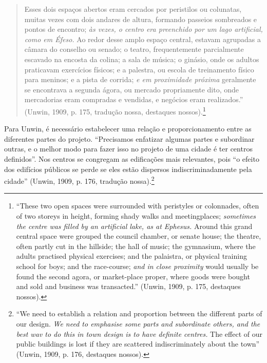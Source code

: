 \documentclass[12pt, a4paper]{book} %
\begin{document}
        \begin{quotation}
            Esses dois espaços abertos eram cercados por peristilos ou colunatas, muitas vezes com dois andares de altura, formando passeios sombreados e pontos de encontro; \textit{às vezes, o centro era preenchido por um lago artificial, como em Éfeso.} Ao redor desse amplo espaço central, estavam agrupadas a câmara do conselho ou senado; o teatro, frequentemente parcialmente escavado na encosta da colina; a sala de música; o ginásio, onde os adultos praticavam exercícios físicos; e a palestra, ou escola de treinamento físico para meninos; e a pista de corrida; \textit{e em proximidade próxima} geralmente se encontrava a segunda ágora, ou mercado propriamente dito, onde mercadorias eram compradas e vendidas, e negócios eram realizados.'' (Unwin, 1909, p. 175, tradução nossa, destaques nossos).\footnote[53]{``These two open spaces were surrounded with peristyles or colonnades, often of two storeys in height, forming shady walks and meetingplaces; \textit{sometimes the centre was filled by an artificial lake, as at Ephesus.} Around this grand central space were grouped the council chamber, or senate house; the theatre, often partly cut in the hillside; the hall of music; the gymnasium, where the adults practised physical exercises; and the palaistra, or physical training school for boys; and the race-course; \textit{and in close proximity} would usually be found the second agora, or market-place proper, where goods were bought and sold and business was transacted.'' (Unwin, 1909, p. 175, destaques nossos).}
        \end{quotation}

        Para Unwin, é necessário estabelecer uma relação e proporcionamento entre as diferentes partes do projeto. ``Precisamos enfatizar algumas partes e subordinar outras, e o melhor modo para fazer isso no projeto de uma cidade é ter centros definidos''. Nos centros se congregam as edificações mais relevantes, pois ``o efeito dos edifícios públicos se perde se eles estão dispersos indiscriminadamente pela cidade'' (Unwin, 1909, p. 176, tradução nossa).\footnote[54]{``We need to establish a relation and proportion between the different parts of our design. \textit{We need to emphasise some parts and subordinate others, and the best wav to do this in town design is to have definite centres.} The effect of our public buildings is lost if they are scattered indiscriminately about the town'' (Unwin, 1909, p. 176, destaques nossos).}
\end{document}
